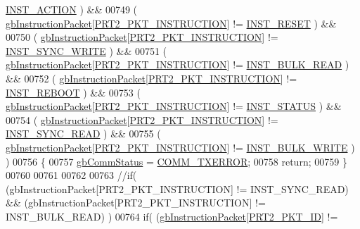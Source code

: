 \begin{DoxyCode}
      \hyperlink{dynamixel_8h_adea21b73305aa7a5b3317e299c616853}{INST\_ACTION}       )  &&
00749         ( \hyperlink{classdynamixel2_a298efe9115fdbf77019af1001e801fb4}{gbInstructionPacket}[\hyperlink{dynamixel_8h_aece9dd9d7c0fa1714d53c568865d79ad}{PRT2\_PKT\_INSTRUCTION}] != 
      \hyperlink{dynamixel_8h_ad670526ca941302efb4a0d00e7dd43c0}{INST\_RESET}         )  &&
00750         ( \hyperlink{classdynamixel2_a298efe9115fdbf77019af1001e801fb4}{gbInstructionPacket}[\hyperlink{dynamixel_8h_aece9dd9d7c0fa1714d53c568865d79ad}{PRT2\_PKT\_INSTRUCTION}] != 
      \hyperlink{dynamixel_8h_aeaa4b61ee11d45bd1a0cb932d7abaf77}{INST\_SYNC\_WRITE}   )  &&
00751         ( \hyperlink{classdynamixel2_a298efe9115fdbf77019af1001e801fb4}{gbInstructionPacket}[\hyperlink{dynamixel_8h_aece9dd9d7c0fa1714d53c568865d79ad}{PRT2\_PKT\_INSTRUCTION}] != 
      \hyperlink{dynamixel_8h_a7967a17d10e9100ffb48ca542ba7587f}{INST\_BULK\_READ}    )  &&
00752         ( \hyperlink{classdynamixel2_a298efe9115fdbf77019af1001e801fb4}{gbInstructionPacket}[\hyperlink{dynamixel_8h_aece9dd9d7c0fa1714d53c568865d79ad}{PRT2\_PKT\_INSTRUCTION}] != 
      \hyperlink{dynamixel_8h_aad0d63532602a783c0e4d6248496c555}{INST\_REBOOT}       )  &&
00753         ( \hyperlink{classdynamixel2_a298efe9115fdbf77019af1001e801fb4}{gbInstructionPacket}[\hyperlink{dynamixel_8h_aece9dd9d7c0fa1714d53c568865d79ad}{PRT2\_PKT\_INSTRUCTION}] != 
      \hyperlink{dynamixel_8h_ad64f9506dd447c94c75405ecae867b87}{INST\_STATUS}       )  &&
00754         ( \hyperlink{classdynamixel2_a298efe9115fdbf77019af1001e801fb4}{gbInstructionPacket}[\hyperlink{dynamixel_8h_aece9dd9d7c0fa1714d53c568865d79ad}{PRT2\_PKT\_INSTRUCTION}] != 
      \hyperlink{dynamixel_8h_a2c0994e6f77bcf585d7dfde88c10441f}{INST\_SYNC\_READ}    )  &&
00755         ( \hyperlink{classdynamixel2_a298efe9115fdbf77019af1001e801fb4}{gbInstructionPacket}[\hyperlink{dynamixel_8h_aece9dd9d7c0fa1714d53c568865d79ad}{PRT2\_PKT\_INSTRUCTION}] != 
      \hyperlink{dynamixel_8h_a54f0a35d92b5238ca86cf770198cc1bf}{INST\_BULK\_WRITE}   ) )
00756     \{
00757         \hyperlink{classdynamixel2_a703e327ba8ec5909c238dc94a00cb32d}{gbCommStatus} = \hyperlink{dynamixel_8h_a1bd7c7b30db4f56dc80cef65ad38afff}{COMM\_TXERROR};
00758         \textcolor{keywordflow}{return};
00759     \}
00760 
00761     
00762 
00763     \textcolor{comment}{//if( (gbInstructionPacket[PRT2\_PKT\_INSTRUCTION] != INST\_SYNC\_READ) &&
       (gbInstructionPacket[PRT2\_PKT\_INSTRUCTION] != INST\_BULK\_READ) )}
00764     \textcolor{keywordflow}{if}( (\hyperlink{classdynamixel2_a298efe9115fdbf77019af1001e801fb4}{gbInstructionPacket}[\hyperlink{dynamixel_8h_a3524b007f8f56ad0d80c1d0caf7e968a}{PRT2\_PKT\_ID}] != 

\end{DoxyCode}
